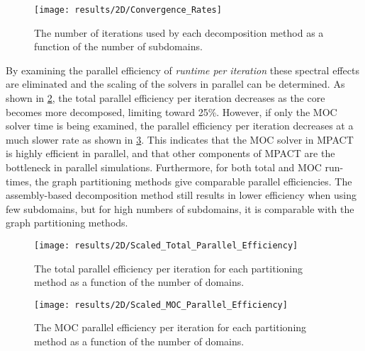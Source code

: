 {{{{        \begin{figure}
          \centering
          \texttt{[image: results/2D/Convergence\_Rates]}
          \caption{The number of iterations used by each decomposition method as a function of the number of subdomains. \label{fig:Spatial Decomposition:Convergence}}
        \end{figure}

        By examining the parallel efficiency of \emph{runtime per iteration} these spectral effects are eliminated and the scaling of the solvers in parallel can be determined.
        As shown in \cref{fig:Spatial Decomposition:Scaled Parallel Efficiency}, the total parallel efficiency per iteration decreases as the core becomes more decomposed, limiting toward 25\%.
        However, if only the \ac{MOC} solver time is being examined, the parallel efficiency per iteration decreases at a much slower rate as shown in \cref{fig:Spatial Decomposition:Scaled MOC Parallel Efficiency}.
        This indicates that the \ac{MOC} solver in MPACT is highly efficient in parallel, and that other components of MPACT are the bottleneck in parallel simulations.
        Furthermore, for both total and \ac{MOC} run-times, the graph partitioning methods give comparable parallel efficiencies.
        The assembly-based decomposition method still results in lower efficiency when using few subdomains, but for high numbers of subdomains, it is comparable with the graph partitioning methods.

        \begin{figure}
          \centering
          \texttt{[image: results/2D/Scaled\_Total\_Parallel\_Efficiency]}
          \caption{The total parallel efficiency per iteration for each partitioning method as a function of the number of domains. \label{fig:Spatial Decomposition:Scaled Parallel Efficiency}}
        \end{figure}

        \begin{figure}
          \centering
          \texttt{[image: results/2D/Scaled\_MOC\_Parallel\_Efficiency]}
          \caption{The \ac{MOC} parallel efficiency per iteration for each partitioning method as a function of the number of domains. \label{fig:Spatial Decomposition:Scaled MOC Parallel Efficiency}}
        \end{figure}


}}}}
